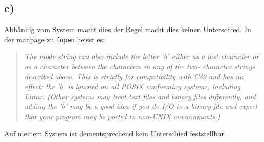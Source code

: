 \documentclass[11pt, a4paper]{scrartcl}
\begin{document}
\subsection*{c)}
Abhänhig vom System macht dies der Regel macht dies keinen Unterschied. In der manpage zu \texttt{fopen} heisst es:
\begin{quote}
\noindent
 \textit{The mode string can also include the letter 'b' either as a last
       character or as a character between the characters in any of the two-
       character strings described above.  This is strictly for
       compatibility with C89 and has no effect; the 'b' is ignored on all
       POSIX conforming systems, including Linux.  (Other systems may treat
       text files and binary files differently, and adding the 'b' may be a
       good idea if you do I/O to a binary file and expect that your program
       may be ported to non-UNIX environments.)}
\end{quote}
Auf meinem System ist dementsprechend kein Unterschied feststellbar.

%
\end{document}
